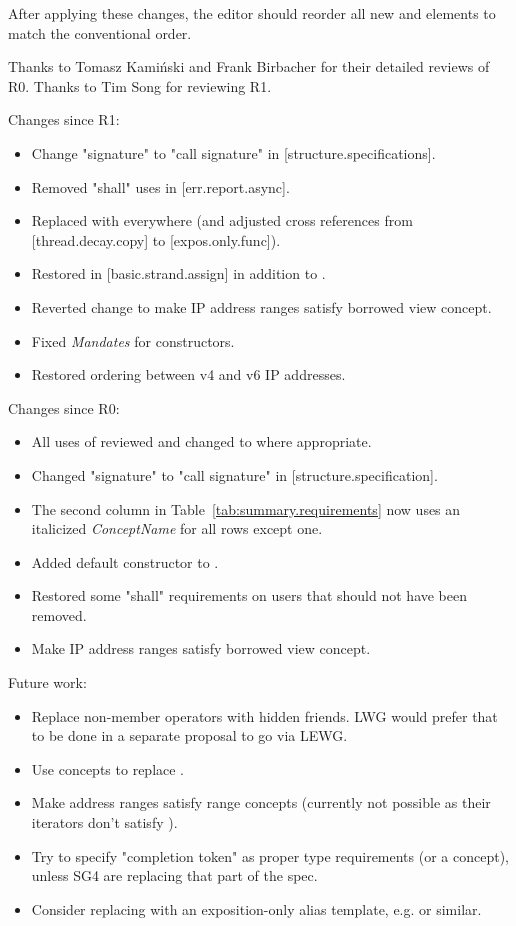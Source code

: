 After applying these changes, the editor should reorder all new
\constraints and \mandates elements to match the conventional order.

\vspace{2.5cm}

Thanks to Tomasz Kamiński and Frank Birbacher for their detailed reviews of R0.
Thanks to Tim Song for reviewing R1.

Changes since R1:
\begin{itemize}
\item Change "signature" to "call signature" in [structure.specifications].
\item Removed "shall" uses in [err.report.async].
\item Replaced  with  everywhere
  (and adjusted cross references from [thread.decay.copy] to [expos.only.func]).
\item Restored \expects in [basic.strand.assign] in addition to \constraints{}.
\item Reverted change to make IP address ranges satisfy borrowed view concept.
\item Fixed \textit{Mandates} for  constructors.
\item Restored ordering between v4 and v6 IP addresses.
\end{itemize}

Changes since R0:
\begin{itemize}
\item All uses of  reviewed and changed to
   where appropriate.
\item Changed "signature" to "call signature" in [structure.specification].
\item The second column in Table~\ref{tab:summary.requirements} now uses
  an italicized \textit{ConceptName} for all rows except one.
\item Added  default constructor to .
\item Restored some "shall" requirements on users that should not have been removed.
\item Make IP address ranges satisfy borrowed view concept.
\end{itemize}

Future work:
\begin{itemize}
\item
Replace non-member operators with hidden friends.
LWG would prefer that to be done in a separate proposal to go via LEWG.
\item
Use concepts to replace .
\item
Make address ranges satisfy range concepts (currently not possible as
their iterators don't satisfy ).
\item
Try to specify "completion token" as proper type requirements (or a concept),
unless SG4 are replacing that part of the spec.
\item
Consider replacing  with an exposition-only alias template,
e.g. 
or similar.
\end{itemize}

